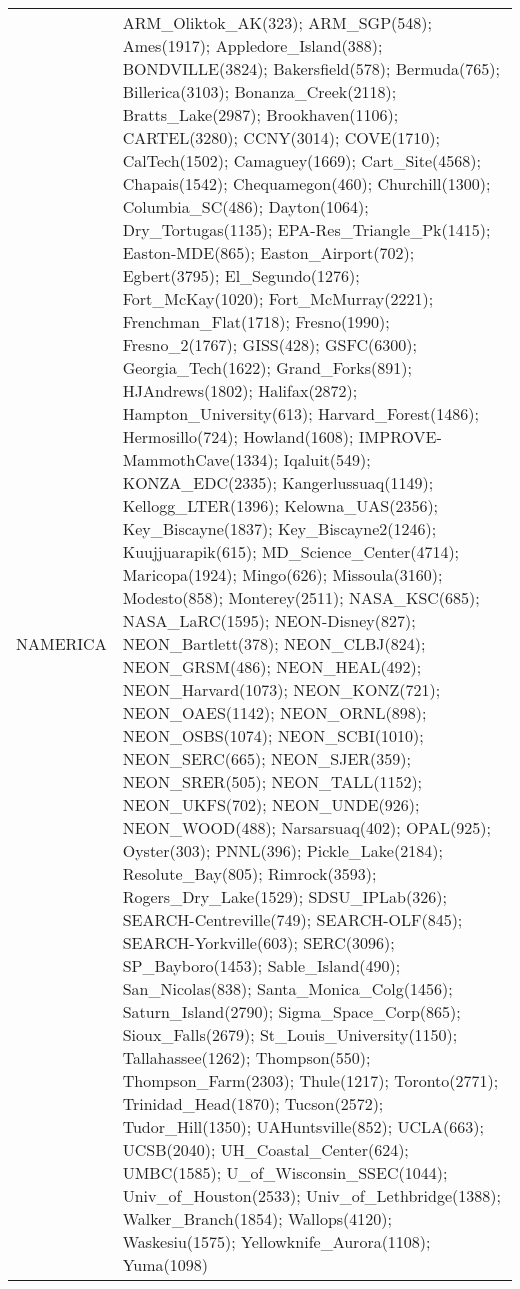 \documentclass[journal abbreviation, manuscript]{copernicus}
\begin{document}
\begin{table}
\begin{tabularx}{\textwidth}{lX}
  NAMERICA &  ARM\_Oliktok\_AK(323); ARM\_SGP(548); Ames(1917); Appledore\_Island(388); BONDVILLE(3824); Bakersfield(578); Bermuda(765); Billerica(3103); Bonanza\_Creek(2118); Bratts\_Lake(2987); Brookhaven(1106); CARTEL(3280); CCNY(3014); COVE(1710); CalTech(1502); Camaguey(1669); Cart\_Site(4568); Chapais(1542); Chequamegon(460); Churchill(1300); Columbia\_SC(486); Dayton(1064); Dry\_Tortugas(1135); EPA-Res\_Triangle\_Pk(1415); Easton-MDE(865); Easton\_Airport(702); Egbert(3795); El\_Segundo(1276); Fort\_McKay(1020); Fort\_McMurray(2221); Frenchman\_Flat(1718); Fresno(1990); Fresno\_2(1767); GISS(428); GSFC(6300); Georgia\_Tech(1622); Grand\_Forks(891); HJAndrews(1802); Halifax(2872); Hampton\_University(613); Harvard\_Forest(1486); Hermosillo(724); Howland(1608); IMPROVE-MammothCave(1334); Iqaluit(549); KONZA\_EDC(2335); Kangerlussuaq(1149); Kellogg\_LTER(1396); Kelowna\_UAS(2356); Key\_Biscayne(1837); Key\_Biscayne2(1246); Kuujjuarapik(615); MD\_Science\_Center(4714); Maricopa(1924); Mingo(626); Missoula(3160); Modesto(858); Monterey(2511); NASA\_KSC(685); NASA\_LaRC(1595); NEON-Disney(827); NEON\_Bartlett(378); NEON\_CLBJ(824); NEON\_GRSM(486); NEON\_HEAL(492); NEON\_Harvard(1073); NEON\_KONZ(721); NEON\_OAES(1142); NEON\_ORNL(898); NEON\_OSBS(1074); NEON\_SCBI(1010); NEON\_SERC(665); NEON\_SJER(359); NEON\_SRER(505); NEON\_TALL(1152); NEON\_UKFS(702); NEON\_UNDE(926); NEON\_WOOD(488); Narsarsuaq(402); OPAL(925); Oyster(303); PNNL(396); Pickle\_Lake(2184); Resolute\_Bay(805); Rimrock(3593); Rogers\_Dry\_Lake(1529); SDSU\_IPLab(326); SEARCH-Centreville(749); SEARCH-OLF(845); SEARCH-Yorkville(603); SERC(3096); SP\_Bayboro(1453); Sable\_Island(490); San\_Nicolas(838); Santa\_Monica\_Colg(1456); Saturn\_Island(2790); Sigma\_Space\_Corp(865); Sioux\_Falls(2679); St\_Louis\_University(1150); Tallahassee(1262); Thompson(550); Thompson\_Farm(2303); Thule(1217); Toronto(2771); Trinidad\_Head(1870); Tucson(2572); Tudor\_Hill(1350); UAHuntsville(852); UCLA(663); UCSB(2040); UH\_Coastal\_Center(624); UMBC(1585); U\_of\_Wisconsin\_SSEC(1044); Univ\_of\_Houston(2533); Univ\_of\_Lethbridge(1388); Walker\_Branch(1854); Wallops(4120); Waskesiu(1575); Yellowknife\_Aurora(1108); Yuma(1098) \\

\end{tabularx}
\end{table}
\end{document}

